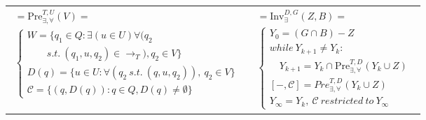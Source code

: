 \begin{table}
\footnotesize
\begin{tabular}{ll}
	\begin{minipage}{.5\textwidth}
		\begin{align}
	[W,\mathcal{C}]=\text{Pre}_{\exists,\forall}^{T,U}(V)=\quad \quad \quad \quad \quad \quad \quad\quad\quad\quad\quad\nonumber\\
	\begin{cases}
	W = \{q_1\in Q: \exists (u\in U) \forall (q_2\\\quad\quad s.t.\ (q_1, u, q_2) \in \rightarrow_T), q_2\in V\}\\
	D(q)=\{u\in U: \forall (q_2\ s.t.\ (q,u,q_2)),\ q_2\in V\}\\
	\mathcal{C}=\{(q,D(q)):q\in Q,D(q)\not=\emptyset\}
	\end{cases}\label{eqn:pre}
	\end{align}
	\end{minipage}& 
\begin{minipage}{.5\textwidth}
\begin{align} [Y_{\infty},\mathcal{C}]=\text{Inv}_{\exists}^{D,G}(Z,B)=\ \quad \quad \quad \nonumber\\
\begin{cases}Y_0 = (G\cap B) - Z\\
while\ Y_{k+1}\not=Y_k:\\
\quad Y_{k+1} = Y_k\cap \text{Pre}_{\exists,\forall}^{T,D}(Y_k\cup Z)\\
[-,\mathcal{C}] = Pre^{T,D}_{\exists,\forall}(Y_k\cup Z)\\
Y_{\infty} = Y_k,\ \mathcal{C}\ restricted\ to\ Y_{\infty}
\end{cases} \label{win-inv} \end{align}
\end{minipage} 
\end{tabular} 
\end{table}

\iffalse	
\begin{algorithm}
	\small
	\caption{$ \text{PGPre}_{\exists,\forall}^{T} (Z,B) $}
	\label{alg:algorithm-label}
	\begin{algorithmic}
		\REQUIRE $ T, U, Z, B $\\
		\STATE $ Z_{\infty} = Z,\ \mathcal{V} = \{\},\ \mathcal{K}=\{\}, k = 1 $
		\FOR{$ U\in 2^U $} \FOR{$ G\in G(U) $}
		\STATE $ [V_k,\mathcal{C}_k]=Inv_{\exists}^{U,G}(Z_{\infty},B) $, $ Z_{\infty} = Z_{\infty} \cup V_k $, $ \mathcal{V}(k)=V_k,\ \mathcal{K}(k)=\mathcal{C}_k $, $ {\color{black} k = k+1} $
		\ENDFOR
		\ENDFOR
		\RETURN $ \mathcal{C} = (\mathcal{V},\mathcal{K},x) $
	\end{algorithmic}
	\label{alg: win-pgpre}
	\end{algorithm}
\fi

